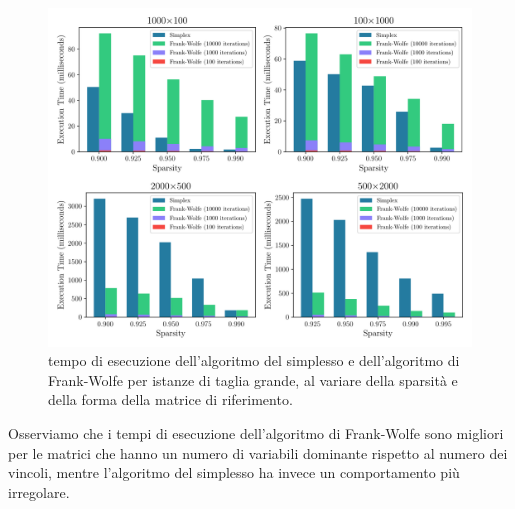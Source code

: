 \begin{figure}[!ht]
    \centering
    \includegraphics[width=\textwidth]{assets/figures/symmetricshape.pdf}
    \caption{tempo di esecuzione dell'algoritmo del simplesso e dell'algoritmo di Frank-Wolfe per istanze di taglia
    grande, al variare della sparsità e della forma della matrice di riferimento.}
    \label{fig:timeshapelast}
\end{figure}

Osserviamo che i tempi di esecuzione dell'algoritmo di Frank-Wolfe sono migliori per le matrici che hanno un numero di
variabili dominante rispetto al numero dei vincoli, mentre l'algoritmo del simplesso ha invece un comportamento più
irregolare.

